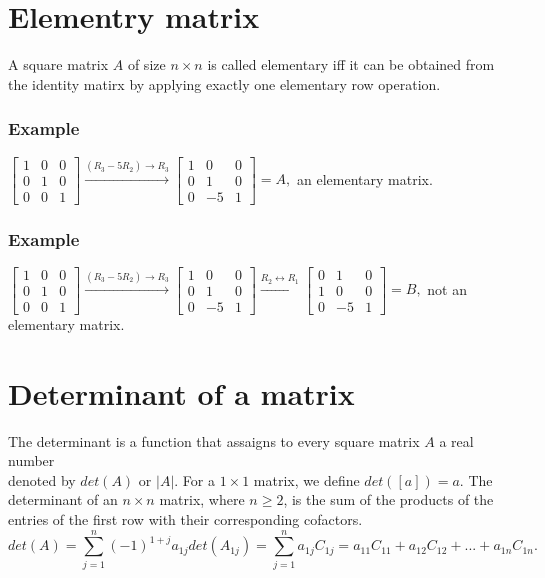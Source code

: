 \documentclass[a4paper,12pt]{article}
\begin{document}
\section{Elementry matrix}
A square matrix $A$ of size $n \times n$ is called elementary iff it can be obtained from the identity matirx by applying exactly one elementary row operation.
    \subsubsection*{Example}
        $\left [ \begin{array}{ccc}
        1&0&0\\
        0&1&0\\
        0&0&1
    \end{array}\right ] \xrightarrow{{(R_3-5R_2)}	\to{R_3}} \left [ \begin{array}{ccc}
        1&0&0\\
        0&1&0\\
        0&-5&1
    \end{array}\right ] =A,$ an elementary matrix.

\subsubsection*{Example}
        $\left [ \begin{array}{ccc}
        1&0&0\\
        0&1&0\\
        0&0&1
    \end{array}\right ] \xrightarrow{{(R_3-5R_2)}	\to{R_3}} \left [ \begin{array}{ccc}
        1&0&0\\
        0&1&0\\
        0&-5&1
    \end{array}\right ] \xrightarrow{{R_2\leftrightarrow R_1}} \left [ \begin{array}{ccc}
        0&1&0\\
        1&0&0\\
        0&-5&1
    \end{array}\right ]= B,$ not an elementary matrix.
\section{Determinant of a matrix}
The determinant is a function that assaigns to every square matrix $A$ a real number \\denoted by $det(A)$ or $|A|$. For a $1 \times 1$ matrix, we define $det([a])=a.$ The determinant of an $n\times n$ matrix, where $n \geq 2$, is the sum of the products of the entries of the first row with their corresponding cofactors.\\
\[det(A)=\sum_{j=1}^{n}(-1)^{1+j}a_{1j}det(A_{1j})=\sum_{j=1}^{n}a_{1j}C_{1j}=a_{11}C_{11}+a_{12}C_{12}+...+a_{1n}C_{1n}.\]
\end{document}
